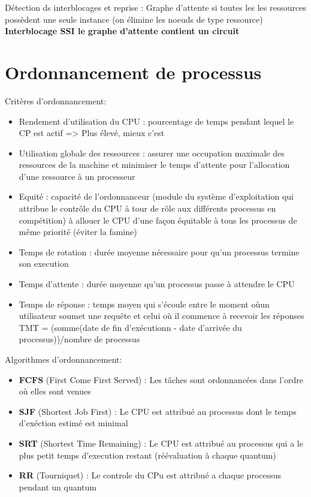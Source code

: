 \documentclass[11pt,a4paper,oneside,french,svgnames]{report}
\begin{document}
Détection ds interblocages et reprise : Graphe d'attente si toutes les les ressources possèdent une seule instance (on élimine les noeuds de type ressource)\\
\textbf{Interblocage SSI le graphe d'attente contient un circuit}


 

\section*{Ordonnancement de processus}
Critères d'ordonnancement:
\begin{itemize}
  \item Rendement d'utilisation du CPU : pourcentage de temps pendant lequel le CP est actif => Plus élevé, mieux c'est
  \item Utilisation globale des ressources : assurer une occupation maximale des ressources de la machine et minimiser le temps d'attente pour l'allocation d'une ressource à un processeur
  \item Equité : capacité de l'ordonnanceur (module du système d'exploitation qui attribue le contrôle du CPU à tour de rôle aux différents processus en compétition) à allouer le CPU d'une façon équitable à tous les processus de même priorité (éviter la  famine)
  \item Temps de rotation : durée moyenne nécessaire pour qu'un processus termine son execution
  \item Temps d'attente : durée moyenne qu'un processus passe à attendre le CPU
  \item Temps de réponse : temps moyen qui s'écoule entre le moment oùun utilisateur soumet une requête et celui où il commence à recevoir les réponses
  TMT = (somme(date de fin d'exécutionn - date d'arrivée du processus))/nombre de processus
\end{itemize}

Algorithmes d'ordonnancement:
\begin{itemize}
\item \textbf{FCFS} (First Come First Served) : Les tâches sont ordonnancées dans l'ordre où elles sont venues
\item \textbf{SJF} (Shortest Job First) : Le CPU est attribué au processus dont le temps d'exéction estimé est minimal
\item \textbf{SRT} (Shortest Time Remaining) : Le CPU est attribué au processus qui a le plus petit temps d'execution restant (réévaluation à chaque quantum)
\item \textbf{RR} (Tourniquet) : Le controle du CPu est attribué a chaque processus pendant un quantum
\end{itemize}
\end{document}

